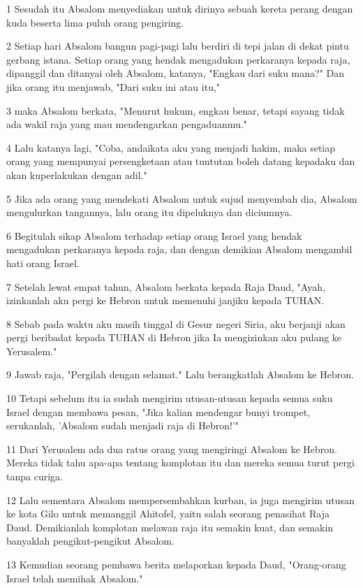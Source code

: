 \par 1 Sesudah itu Absalom menyediakan untuk dirinya sebuah kereta perang dengan kuda beserta lima puluh orang pengiring.
\par 2 Setiap hari Absalom bangun pagi-pagi lalu berdiri di tepi jalan di dekat pintu gerbang istana. Setiap orang yang hendak mengadukan perkaranya kepada raja, dipanggil dan ditanyai oleh Absalom, katanya, "Engkau dari suku mana?" Dan jika orang itu menjawab, "Dari suku ini atau itu,"
\par 3 maka Absalom berkata, "Menurut hukum, engkau benar, tetapi sayang tidak ada wakil raja yang mau mendengarkan pengaduanmu."
\par 4 Lalu katanya lagi, "Coba, andaikata aku yang menjadi hakim, maka setiap orang yang mempunyai persengketaan atau tuntutan boleh datang kepadaku dan akan kuperlakukan dengan adil."
\par 5 Jika ada orang yang mendekati Absalom untuk sujud menyembah dia, Absalom mengulurkan tangannya, lalu orang itu dipeluknya dan diciumnya.
\par 6 Begitulah sikap Absalom terhadap setiap orang Israel yang hendak mengadukan perkaranya kepada raja, dan dengan demikian Absalom mengambil hati orang Israel.
\par 7 Setelah lewat empat tahun, Absalom berkata kepada Raja Daud, "Ayah, izinkanlah aku pergi ke Hebron untuk memenuhi janjiku kepada TUHAN.
\par 8 Sebab pada waktu aku masih tinggal di Gesur negeri Siria, aku berjanji akan pergi beribadat kepada TUHAN di Hebron jika Ia mengizinkan aku pulang ke Yerusalem."
\par 9 Jawab raja, "Pergilah dengan selamat." Lalu berangkatlah Absalom ke Hebron.
\par 10 Tetapi sebelum itu ia sudah mengirim utusan-utusan kepada semua suku Israel dengan membawa pesan, "Jika kalian mendengar bunyi trompet, serukanlah, 'Absalom sudah menjadi raja di Hebron!'"
\par 11 Dari Yerusalem ada dua ratus orang yang mengiringi Absalom ke Hebron. Mereka tidak tahu apa-apa tentang komplotan itu dan mereka semua turut pergi tanpa curiga.
\par 12 Lalu sementara Absalom mempersembahkan kurban, ia juga mengirim utusan ke kota Gilo untuk memanggil Ahitofel, yaitu salah seorang penasihat Raja Daud. Demikianlah komplotan melawan raja itu semakin kuat, dan semakin banyaklah pengikut-pengikut Absalom.
\par 13 Kemudian seorang pembawa berita melaporkan kepada Daud, "Orang-orang Israel telah memihak Absalom."

